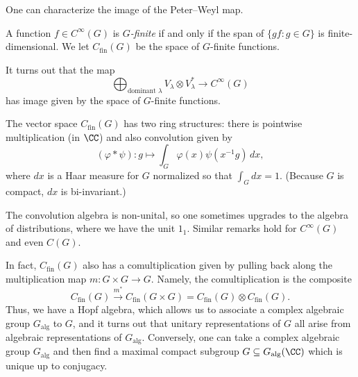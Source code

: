 \documentclass[../notes.tex]{subfiles}
\begin{document}
One can characterize the image of the Peter--Weyl map.
\begin{definition}[finite]
	A function $f\in C^\infty(G)$ is \textit{$G$-finite} if and only if the span of $\{gf:g\in G\}$ is finite-dimensional. We let $C_{\mathrm{fin}}(G)$ be the space of $G$-finite functions.
\end{definition}
\begin{remark}
	It turns out that the map
	\[\bigoplus_{\text{dominant }\lambda}V_\lambda\otimes V_\lambda^*\to C^\infty(G)\]
	has image given by the space of $G$-finite functions.
\end{remark}
\begin{remark}
	The vector space $C_{\mathrm{fin}}(G)$ has two ring structures: there is pointwise multiplication (in $\CC$) and also convolution given by
	\[(\varphi*\psi)\colon g\mapsto\int_G\varphi(x)\psi\left(x^{-1}g\right)\,dx,\]
	where $dx$ is a Haar measure for $G$ normalized so that $\int_Gdx=1$. (Because $G$ is compact, $dx$ is bi-invariant.)
\end{remark}
\begin{remark}
	The convolution algebra is non-unital, so one sometimes upgrades to the algebra of distributions, where we have the unit $1_1$. Similar remarks hold for $C^\infty(G)$ and even $C(G)$.
\end{remark}
\begin{remark}
	In fact, $C_{\mathrm{fin}}(G)$ also has a comultiplication given by pulling back along the multiplication map $m\colon G\times G\to G$. Namely, the comultiplication is the composite
	\[C_{\mathrm{fin}}(G)\stackrel{m^*}\to C_{\mathrm{fin}}(G\times G)=C_{\mathrm{fin}}(G)\otimes C_{\mathrm{fin}}(G).\]
	Thus, we have a Hopf algebra, which allows us to associate a complex algebraic group $G_{\mathrm{alg}}$ to $G$, and it turns out that unitary representations of $G$ all arise from algebraic representations of $G_{\mathrm{alg}}$. Conversely, one can take a complex algebraic group $G_{\mathrm{alg}}$ and then find a maximal compact subgroup $G\subseteq G_{\mathrm{alg}}(\CC)$ which is unique up to conjugacy.
\end{remark}
\end{document}
